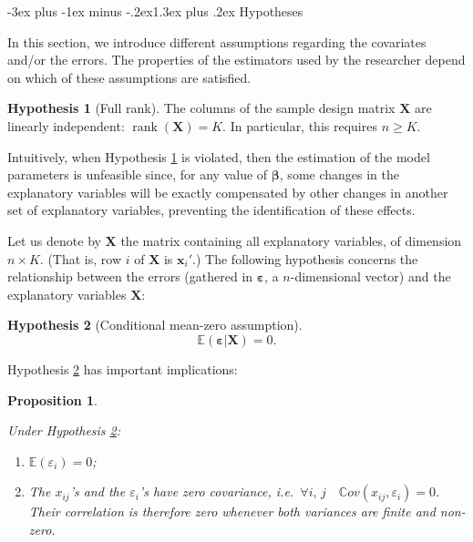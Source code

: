 \documentclass[
  11pt,
]{book}
\makeatletter
\providecommand{\tightlist}{%
  \setlength{\itemsep}{0pt}\setlength{\parskip}{0pt}}
\renewcommand\section{\@startsection{section}{1}{\z@}
  {-3ex plus -1ex minus -.2ex}{1.3ex plus .2ex}
  {\normalfont\Large\bfseries\color{TextbookInk}}}
\newtheorem{proposition}{Proposition}[chapter]
\theoremstyle{definition}
\theoremstyle{definition}
\theoremstyle{definition}
\theoremstyle{definition}
\newtheorem{hypothesis}{Hypothesis}[chapter]
\theoremstyle{remark}
\makeatother
\begin{document}
\section{Hypotheses}\label{linearHyp}

In this section, we introduce different assumptions regarding the covariates and/or the errors. The properties of the estimators used by the researcher depend on which of these assumptions are satisfied.

\begin{hypothesis}[Full rank]
\protect\hypertarget{hyp:fullrank}{}\label{hyp:fullrank}The columns of the sample design matrix \(\mathbf{X}\) are linearly independent: \(\operatorname{rank}(\mathbf{X})=K\). In particular, this requires \(n\ge K\).
\end{hypothesis}

Intuitively, when Hypothesis \ref{hyp:fullrank} is violated, then the estimation of the model parameters is unfeasible since, for any value of \(\boldsymbol\beta\), some changes in the explanatory variables will be exactly compensated by other changes in another set of explanatory variables, preventing the identification of these effects.

Let us denote by \(\mathbf{X}\) the matrix containing all explanatory variables, of dimension \(n \times K\). (That is, row \(i\) of \(\mathbf{X}\) is \(\mathbf{x}_i'\).) The following hypothesis concerns the relationship between the errors (gathered in \(\boldsymbol\varepsilon\), a \(n\)-dimensional vector) and the explanatory variables \(\mathbf{X}\):

\begin{hypothesis}[Conditional mean-zero assumption]
\protect\hypertarget{hyp:exogeneity}{}\label{hyp:exogeneity}\begin{equation}
\mathbb{E}(\boldsymbol\varepsilon|\mathbf{X}) = 0.
\end{equation}
\end{hypothesis}

Hypothesis \ref{hyp:exogeneity} has important implications:

\begin{proposition}
\protect\hypertarget{prp:implicationExog}{}\label{prp:implicationExog}

Under Hypothesis \ref{hyp:exogeneity}:

\begin{enumerate}
\def\labelenumi{\roman{enumi}.}
\tightlist
\item
  \(\mathbb{E}(\varepsilon_{i})=0\);
\item
  The \(x_{ij}\)'s and the \(\varepsilon_{i}\)'s have zero covariance, i.e.~\(\forall i,\,j \quad \mathbb{C}ov(x_{ij},\varepsilon_{i})=0\). Their correlation is therefore zero whenever both variances are finite and non-zero.
\end{enumerate}

\end{proposition}
\end{document}
